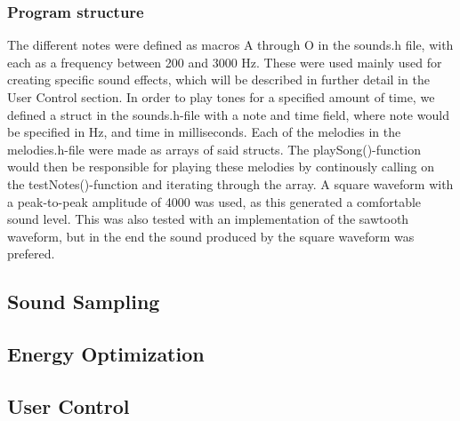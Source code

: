 \subsubsection{Program structure}

The different notes were defined as macros A through O in the sounds.h file, with each as a frequency between 200 and 3000 Hz. These were used mainly used for creating specific sound effects, which will be described in further detail in the User Control section.
	In order to play tones for a specified amount of time, we defined a struct in the sounds.h-file with a note and time field, where note would be specified in Hz, and time in milliseconds. Each of the melodies in the melodies.h-file were made as arrays of said structs. The playSong()-function would then be responsible for playing these melodies by continously calling on the testNotes()-function and iterating through the array. A square waveform with a peak-to-peak amplitude of 4000 was used, as this generated a comfortable sound level. This was also tested with an implementation of the sawtooth waveform, but in the end the sound produced by the square waveform was prefered.

\subsection{Sound Sampling}



\subsection{Energy Optimization}




\subsection{User Control}
